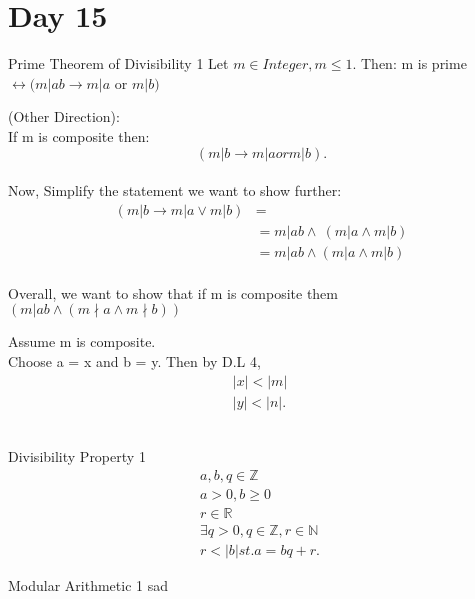 \documentclass{report}
\begin{document}
\chapter {Day 15}


\begin{theorem} {Prime Theorem of Divisibility} { 1 }
  Let $m \in Integer, m \le 1$. Then:
  m is prime $\leftrightarrow  (m|ab \to m|a$ or $m|b)$
\end{theorem}

  
 {
  (Other Direction): \\
  If m is composite then: \\
  \[
  ~(m|b \to m|a or m|b)
  .\]  \\

  Now, Simplify the statement we want to show further: \\
  \begin{align*}
    ~(m|b \to  m|a \lor m|b) &= \\
                       &= m|ab \land ~(m|a \land m|b) \\
                       &= m|ab \land (m|a \land m|b) \\
  \end{align*}

  Overall, we want to show that if m is composite them $(m|ab \land (m \nmid a \land m \nmid b))$ \\
  \par Assume m is composite. \\

  Choose a = x and b = y. Then by D.L 4,
  \begin{align*}
  |x| < |m| \\
  |y| < |n|
  .\end{align*} \\
}


\begin{definition} {Divisibility Property} { 1 }
  \begin{align*}
    a,b,q \in \mathbb{Z} \\
    a > 0, b \geq 0 \\
    r \in \mathbb{R} \\
    \exists q > 0, q \in \mathbb{Z}, r \in \mathbb{N} \\
    r < |b| st. a = bq + r
  .\end{align*}
\end{definition}

\begin{definition} {Modular Arithmetic} { 1 }
    sad
\end{definition}
\end{document}
